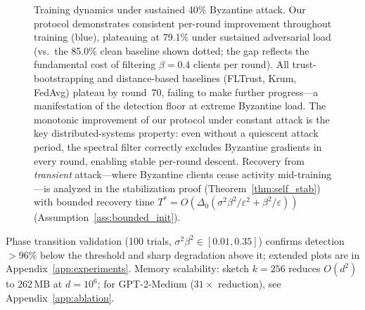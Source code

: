 \begin{figure}[htbp]
\caption{Training dynamics under sustained 40\% Byzantine attack. Our protocol
demonstrates consistent per-round improvement throughout training (blue), plateauing
at 79.1\% under sustained adversarial load (vs.\ the 85.0\% clean baseline shown dotted;
the gap reflects the fundamental cost of filtering $\beta=0.4$ clients per round).
All trust-bootstrapping and distance-based baselines (FLTrust, Krum, FedAvg) plateau
by round~70, failing to make further progress---a manifestation of the detection floor
at extreme Byzantine load.
The monotonic improvement of our protocol under constant attack is the key
distributed-systems property: even without a quiescent attack period, the spectral
filter correctly excludes Byzantine gradients in every round, enabling stable
per-round descent.
Recovery from \emph{transient} attack---where Byzantine clients cease activity mid-training---is
analyzed in the stabilization proof (Theorem~\ref{thm:self_stab}) with bounded
recovery time $T^* = O(\Delta_0(\sigma^2\beta^2/\varepsilon^2 + \beta^2/\varepsilon))$ (Assumption~\ref{ass:bounded_init}).}
\label{fig:convergence}
\end{figure}

Phase transition validation (100 trials, $\sigma^2\beta^2 \in [0.01,0.35]$) confirms detection $>96\%$ below the threshold and sharp degradation above it; extended plots are in Appendix~\ref{app:experiments}.
Memory scalability: sketch $k{=}256$ reduces $O(d^2)$ to 262\,MB at $d{=}10^6$; for GPT-2-Medium ($31{\times}$ reduction), see Appendix~\ref{app:ablation}.
